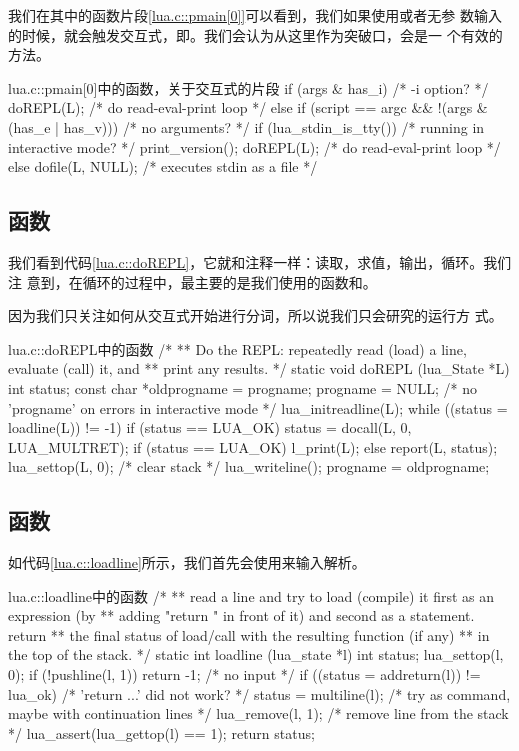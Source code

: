 我们在其中的函数片段\ref{lua.c::pmain[0]}可以看到，我们如果使用或者无参
数输入的时候，就会触发交互式，即。我们会认为从这里作为突破口，会是一
个有效的方法。

\begin{ccode}{lua.c::pmain[0]}{中的函数，关于交互式的片段}
  if (args & has_i)  /* -i option? */
    doREPL(L);  /* do read-eval-print loop */
  else if (script == argc && !(args & (has_e | has_v))) {  /* no arguments? */
    if (lua_stdin_is_tty()) {  /* running in interactive mode? */
      print_version();
      doREPL(L);  /* do read-eval-print loop */
    }
    else dofile(L, NULL);  /* executes stdin as a file */
  }
\end{ccode}

\subsection{函数}

我们看到代码\ref{lua.c::doREPL}，它就和注释一样：读取，求值，输出，循环。我们注
意到，在循环的过程中，最主要的是我们使用的函数和。

因为我们只关注如何从交互式开始进行分词，所以说我们只会研究的运行方
式。

\begin{ccode}{lua.c::doREPL}{中的函数}
/*
** Do the REPL: repeatedly read (load) a line, evaluate (call) it, and
** print any results.
*/
static void doREPL (lua_State *L) {
  int status;
  const char *oldprogname = progname;
  progname = NULL;  /* no 'progname' on errors in interactive mode */
  lua_initreadline(L);
  while ((status = loadline(L)) != -1) {
    if (status == LUA_OK)
      status = docall(L, 0, LUA_MULTRET);
    if (status == LUA_OK) l_print(L);
    else report(L, status);
  }
  lua_settop(L, 0);  /* clear stack */
  lua_writeline();
  progname = oldprogname;
}
\end{ccode}

\subsection{函数}

如代码\ref{lua.c::loadline}所示，我们首先会使用来输入解析。

\begin{ccode}{lua.c::loadline}{中的函数}
/*
** read a line and try to load (compile) it first as an expression (by
** adding "return " in front of it) and second as a statement. return
** the final status of load/call with the resulting function (if any)
** in the top of the stack.
*/
static int loadline (lua_state *l) {
  int status;
  lua_settop(l, 0);
  if (!pushline(l, 1))
    return -1;  /* no input */
  if ((status = addreturn(l)) != lua_ok)  /* 'return ...' did not work? */
    status = multiline(l);  /* try as command, maybe with continuation lines */
  lua_remove(l, 1);  /* remove line from the stack */
  lua_assert(lua_gettop(l) == 1);
  return status;
}
\end{ccode}

